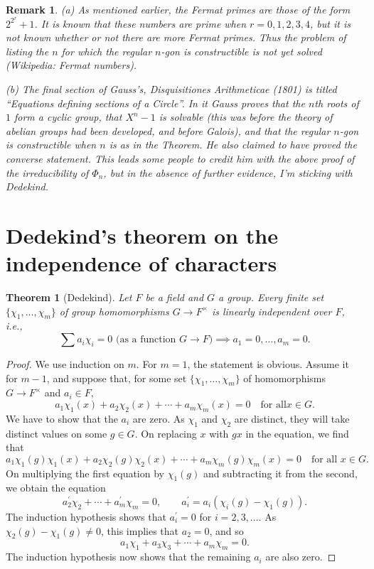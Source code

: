 \documentclass[a4paper,11pt,final,openany]{memoir}
\newtheorem{theorem}[X]{Theorem}
\newtheorem{remark}[X]{Remark}
\theoremstyle{nonumberplain}
\newtheorem{proof}{Proof.}
\begin{document}
\begin{remark}
\label{ag12}(a) As mentioned earlier, the Fermat primes are those of the form
$2^{2^{r}}+1$. It is known that these numbers are prime when $r=0,1,2,3,4$,
but it is not known whether or not there are more Fermat primes. Thus the
problem of listing the $n$ for which the regular $n$-gon is constructible is
not yet solved (Wikipedia: Fermat numbers).

(b) The final section of Gauss's, \textit{Disquisitiones Arithmeticae}%
\emph{\/} (1801) is titled \textquotedblleft Equations defining sections of a
Circle\textquotedblright. In it Gauss proves that the $n$th roots of $1$ form
a cyclic group, that $X^{n}-1$ is solvable (this was before the theory of
abelian groups had been developed, and before Galois), and that the regular
$n$-gon is constructible when $n$ is as in the Theorem. He also claimed to
have proved the converse statement. This leads some people to credit him with
the above proof of the irreducibility of $\Phi_{n}$, but in the absence of
further evidence, I'm sticking with Dedekind.
\end{remark}

\section{Dedekind's theorem on the independence of characters}

\begin{theorem}
[Dedekind]\label{ag13}%
%
Let $F$ be a field and $G$ a group. Every finite set $\{\chi_{1},\ldots
,\chi_{m}\}$ of group homomorphisms $G\rightarrow F^{\times}$ is linearly
independent over $F$, i.e.,
\[
\sum a_{i}\chi_{i}=0\text{\ (as a function }G\rightarrow F)\implies
a_{1}=0,\ldots,a_{m}=0.
\]

\end{theorem}

\begin{proof}
We use induction on $m$. For $m=1$, the statement is obvious. Assume it for
$m-1$, and suppose that, for some set $\{\chi_{1},\ldots,\chi_{m}\}$ of
homomorphisms $G\rightarrow F^{\times}$ and $a_{i}\in F$,%
\[
a_{1}\chi_{1}(x)+a_{2}\chi_{2}(x)+\cdots+a_{m}\chi_{m}(x)=0\quad\text{for all
}x\in G.
\]
We have to show that the $a_{i}$ are zero. As $\chi_{1}$ and $\chi_{2}$ are
distinct, they will take distinct values on some $g\in G$. On replacing $x$
with $gx$ in the equation, we find that
\[
a_{1}\chi_{1}(g)\chi_{1}(x)+a_{2}\chi_{2}(g)\chi_{2}(x)+\cdots+a_{m}\chi
_{m}(g)\chi_{m}(x)=0\quad\text{for all }x\in G.
\]
On multiplying the first equation by $\chi_{1}(g)$ and subtracting it from the
second, we obtain the equation
\[
a_{2}^{\prime}\chi_{2}+\cdots+a_{m}^{\prime}\chi_{m}=0,\qquad a_{i}^{\prime
}=a_{i}(\chi_{i}(g)-\chi_{1}(g)).
\]
The induction hypothesis shows that $a_{i}^{\prime}=0$ for $i=2,3,\ldots$. As
$\chi_{2}(g)-\chi_{1}(g)\neq0$, this implies that $a_{2}=0$, and so%
\[
a_{1}\chi_{1}+a_{3}\chi_{3}+\cdots+a_{m}\chi_{m}=0.
\]
The induction hypothesis now shows that the remaining $a_{i}$ are also zero.
\end{proof}
\end{document}
